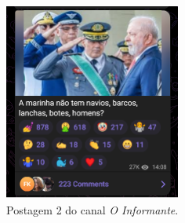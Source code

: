 \documentclass[portuguese]{textolivre}
\begin{document}
\begin{figure}[h!]
\begin{minipage}[t]{0.38\textwidth}
        \includegraphics[width=\linewidth]{Imagens/Fig14.png}
        \caption{Postagem 2 do canal \emph{O Informante}.}
        \label{fig-14}
    \end{minipage}
    
    \vspace{0.2cm} %
    

\end{figure}
\end{document}
